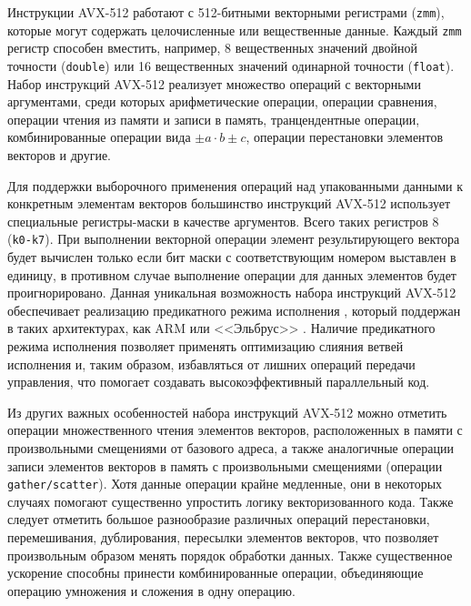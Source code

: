 \documentclass[utf8]{psta}
\begin{document}
Инструкции AVX-512 работают с 512-битными векторными регистрами (\texttt{zmm}), которые могут содержать целочисленные или вещественные данные. Каждый \texttt{zmm} регистр способен вместить, например, 8 вещественных значений двойной точности (\texttt{double}) или 16 вещественных значений одинарной точности (\texttt{float}).
Набор инструкций AVX-512 реализует множество операций с векторными аргументами, среди которых арифметические операции, операции сравнения, операции чтения из памяти и записи в память, транцендентные операции, комбинированные операции вида $\pm a \cdot b \pm c$, операции перестановки элементов векторов и другие.

Для поддержки выборочного применения операций над упакованными данными к конкретным элементам векторов большинство инструкций AVX-512 использует специальные регистры-маски в качестве аргументов.
Всего таких регистров 8 (\texttt{k0-k7}).
При выполнении векторной операции элемент результирующего вектора будет вычислен только если бит маски с соответствующим номером выставлен в единицу, в противном случае выполнение операции для данных элементов будет проигнорировано.
Данная уникальная возможность набора инструкций AVX-512 обеспечивает реализацию предикатного режима исполнения \cite{VolOkuPred}, который поддержан в таких архитектурах, как ARM или <<Эльбрус>> \cite{KimElbrus}.
Наличие предикатного режима исполнения позволяет применять оптимизацию слияния ветвей исполнения и, таким образом, избавляться от лишних операций передачи управления, что помогает создавать высокоэффективный параллельный код.

Из других важных особенностей набора инструкций AVX-512 можно отметить операции множественного чтения элементов векторов, расположенных в памяти с произвольными смещениями от базового адреса, а также аналогичные операции записи элементов векторов в память с произвольными смещениями (операции \texttt{gather/scatter}).
Хотя данные операции крайне медленные, они в некоторых случаях помогают существенно упростить логику векторизованного кода.
Также следует отметить большое разнообразие различных операций перестановки, перемешивания, дублирования, пересылки элементов векторов, что позволяет произвольным образом менять порядок обработки данных.
Также существенное ускорение способны принести комбинированные операции, объединяющие операцию умножения и сложения в одну операцию.
\end{document}
